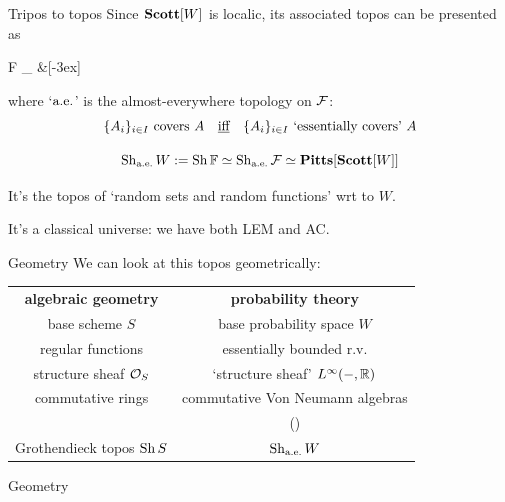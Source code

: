 \begin{frame}{Tripos to topos}
	Since $\mathbf{Scott}[W]$ is localic, its associated topos can be presented as
	\begin{diagram*}
		\Sh \alg F \equi \Sh_\aetop \F {} \&[-3ex] \Sh \F
	\end{diagram*}
	where `$\text{a.e.}$' is the almost-everywhere topology on $\mathcal{F}$:
	\begin{equation*}
		\text{$\{A_i\}_{i \in I}$ covers $A$}
		\quad\text{\underline{iff}}\quad
		\text{$\{A_i\}_{i \in I}$ `essentially covers' $A$}
	\end{equation*}

	\vfill
	\begin{definition}
		\begin{equation*}
			\operatorname{Sh}_{\text{a.e.}} W := \operatorname{Sh} \mathbb{F} \simeq \operatorname{Sh}_{\text{a.e.}} \mathcal{F} \simeq \mathbf{Pitts}[\mathbf{Scott}[W]]
		\end{equation*}
	\end{definition}

	\vfill
	It's the topos of `random sets and random functions' wrt to $W$.

	It's a classical universe: we have both LEM and AC.
\end{frame}


\begin{frame}{Geometry}
	We can look at this topos geometrically:

	\vfill
	\begin{center}
		\begin{tabularx}{\columnwidth}{C|c}
			\textbf{algebraic geometry} & \textbf{probability theory}\\[2ex]
			base scheme $S$ & base probability space $W$\\[2ex]
			regular functions & essentially bounded r.v.\\[2ex]
			structure sheaf $\mathcal{O}_S$ & `structure sheaf' $L^\infty(-,\mathbb{R})$\\[2ex]
			commutative rings & commutative Von Neumann algebras\\
			& ()\\[2ex]
			Grothendieck topos $\operatorname{Sh} S$ &  $\operatorname{Sh}_{\text{a.e.}} W$
		\end{tabularx}
	\end{center}
	\vfill
\end{frame}

{
	\begin{frame}{Geometry}
	\end{frame}
}

